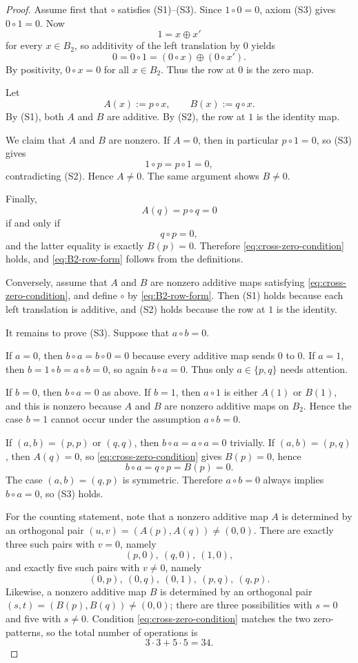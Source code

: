 \documentclass[10pt,a4paper]{amsart}
\newcommand{\op}{\oplus}
\begin{document}
\begin{proof}
Assume first that $\circ$ satisfies \textup{(S1)}--\textup{(S3)}. Since $1\circ 0=0$, axiom \textup{(S3)} gives $0\circ 1=0$. Now
\[
1=x\op x'
\]
for every $x\in B_2$, so additivity of the left translation by $0$ yields
\[
0=0\circ 1=(0\circ x)\op(0\circ x').
\]
By positivity, $0\circ x=0$ for all $x\in B_2$. Thus the row at $0$ is the zero map.

Let
\[
A(x):=p\circ x,
\qquad
B(x):=q\circ x.
\]
By \textup{(S1)}, both $A$ and $B$ are additive. By \textup{(S2)}, the row at $1$ is the identity map.

We claim that $A$ and $B$ are nonzero. If $A=0$, then in particular $p\circ 1=0$, so \textup{(S3)} gives
\[
1\circ p=p\circ 1=0,
\]
contradicting \textup{(S2)}. Hence $A\neq 0$. The same argument shows $B\neq 0$.

Finally,
\[
A(q)=p\circ q=0
\]
if and only if
\[
q\circ p=0,
\]
and the latter equality is exactly $B(p)=0$. Therefore \eqref{eq:cross-zero-condition} holds, and \eqref{eq:B2-row-form} follows from the definitions.

Conversely, assume that $A$ and $B$ are nonzero additive maps satisfying \eqref{eq:cross-zero-condition}, and define $\circ$ by \eqref{eq:B2-row-form}. Then \textup{(S1)} holds because each left translation is additive, and \textup{(S2)} holds because the row at $1$ is the identity.

It remains to prove \textup{(S3)}. Suppose that $a\circ b=0$.

If $a=0$, then $b\circ a=b\circ 0=0$ because every additive map sends $0$ to $0$. If $a=1$, then $b=1\circ b=a\circ b=0$, so again $b\circ a=0$. Thus only $a\in\{p,q\}$ needs attention.

If $b=0$, then $b\circ a=0$ as above. If $b=1$, then $a\circ 1$ is either $A(1)$ or $B(1)$, and this is nonzero because $A$ and $B$ are nonzero additive maps on $B_2$. Hence the case $b=1$ cannot occur under the assumption $a\circ b=0$.

If $(a,b)=(p,p)$ or $(q,q)$, then $b\circ a=a\circ a=0$ trivially. If $(a,b)=(p,q)$, then $A(q)=0$, so \eqref{eq:cross-zero-condition} gives $B(p)=0$, hence
\[
b\circ a=q\circ p=B(p)=0.
\]
The case $(a,b)=(q,p)$ is symmetric. Therefore $a\circ b=0$ always implies $b\circ a=0$, so \textup{(S3)} holds.

For the counting statement, note that a nonzero additive map $A$ is determined by an orthogonal pair $(u,v)=(A(p),A(q))\neq(0,0)$. There are exactly three such pairs with $v=0$, namely
\[
(p,0),\ (q,0),\ (1,0),
\]
and exactly five such pairs with $v\neq 0$, namely
\[
(0,p),\ (0,q),\ (0,1),\ (p,q),\ (q,p).
\]
Likewise, a nonzero additive map $B$ is determined by an orthogonal pair $(s,t)=(B(p),B(q))\neq(0,0)$; there are three possibilities with $s=0$ and five with $s\neq 0$. Condition \eqref{eq:cross-zero-condition} matches the two zero-patterns, so the total number of operations is
\[
3\cdot 3+5\cdot 5=34.
\]
\end{proof}
\end{document}
